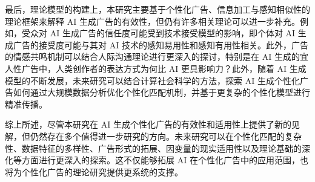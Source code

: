 最后，理论模型的构建上，本研究主要基于个性化广告、信息加工与感知相似性的理论框架来解释 AI 生成广告的有效性，但仍有许多相关理论可以进一步补充。例如，受众对 AI 生成广告的信任度可能受到技术接受模型的影响\citep{davis1989perceived}，即个体对 AI 生成广告的接受度可能与其对 AI 技术的感知易用性和感知有用性相关。此外，广告的情感共鸣机制可以结合人际沟通理论进行更深入的探讨，特别是在 AI 生成的宜人性广告中，人类创作者的表达方式为何比 AI 更具影响力？此外，随着 AI 生成模型的不断发展，未来研究可以结合计算社会科学的方法，探索 AI 生成个性化广告如何通过大规模数据分析优化个性化匹配机制，并基于更复杂的个性化模型进行精准传播。

综上所述，尽管本研究在 AI 生成个性化广告的有效性和适用性上提供了新的见解，但仍然存在多个值得进一步研究的方向。未来研究可以在个性化匹配的复杂性、数据特征的多样性、广告形式的拓展、因变量的现实适用性以及理论基础的深化等方面进行更深入的探索。这不仅能够拓展 AI 在个性化广告中的应用范围，也将为个性化广告的理论研究提供更系统的支撑。